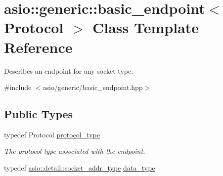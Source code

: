 \hypertarget{classasio_1_1generic_1_1basic__endpoint}{}\section{asio\+:\+:generic\+:\+:basic\+\_\+endpoint$<$ Protocol $>$ Class Template Reference}
\label{classasio_1_1generic_1_1basic__endpoint}


Describes an endpoint for any socket type.  




{\ttfamily \#include $<$asio/generic/basic\+\_\+endpoint.\+hpp$>$}

\subsection*{Public Types}
\begin{DoxyCompactItemize}
\item 
typedef Protocol \hyperlink{classasio_1_1generic_1_1basic__endpoint_adbb1d24211763cf405138afcc29330da}{protocol\+\_\+type}
\begin{DoxyCompactList}\small\item\em The protocol type associated with the endpoint. \end{DoxyCompactList}\item 
typedef \hyperlink{namespaceasio_1_1detail_a40a7b0385a38f87815ffbb8df5e34d05}{asio\+::detail\+::socket\+\_\+addr\+\_\+type} \hyperlink{classasio_1_1generic_1_1basic__endpoint_af8fe7c173ad82680b104c83000eab645}{data\+\_\+type}
\end{DoxyCompactItemize}

